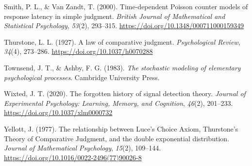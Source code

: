 \documentclass[
  man,
  floatsintext,
  longtable,
  a4paper,
  nolmodern,
  notxfonts,
  notimes,
  colorlinks=true,linkcolor=blue,citecolor=blue,urlcolor=blue]{apa7}
\newlength{\cslhangindent}
\newenvironment{CSLReferences}[2] %
 {\begin{list}{}{%
  \setlength{\itemindent}{0pt}
  \setlength{\leftmargin}{0pt}
  \setlength{\parsep}{0pt}
  \ifodd #1
   \setlength{\leftmargin}{\cslhangindent}
   \setlength{\itemindent}{-1\cslhangindent}
  \fi
  \setlength{\itemsep}{#2\baselineskip}}}
 {\end{list}}
\begin{document}
\begin{CSLReferences}{1}{0}
Smith, P. L., \& Van Zandt, T. (2000). Time-dependent {Poisson} counter
models of response latency in simple judgment. \emph{British Journal of
Mathematical and Statistical Psychology}, \emph{53}(2), 293--315.
\url{https://doi.org/10.1348/000711000159349}

Thurstone, L. L. (1927). A law of comparative judgment.
\emph{Psychological Review}, \emph{34}(4), 273--286.
\url{https://doi.org/10.1037/h0070288}

Townsend, J. T., \& Ashby, F. G. (1983). \emph{The stochastic modeling
of elementary psychological processes}. Cambridge University Press.

Wixted, J. T. (2020). The forgotten history of signal detection theory.
\emph{Journal of Experimental Psychology: Learning, Memory, and
Cognition}, \emph{46}(2), 201--233.
\url{https://doi.org/10.1037/xlm0000732}

Yellott, J. (1977). The relationship between {Luce}'s {Choice Axiom},
{Thurstone}'s {Theory} of {Comparative Judgment}, and the double
exponential distribution. \emph{Journal of Mathematical Psychology},
\emph{15}(2), 109--144.
\url{https://doi.org/10.1016/0022-2496(77)90026-8}

\end{CSLReferences}
\end{document}
